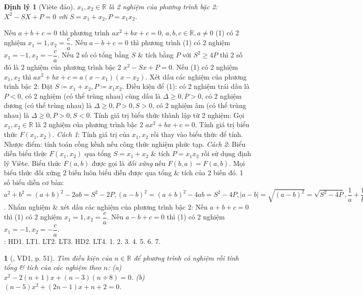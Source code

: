 \documentclass{article}
\newtheorem{baitoan}{}
\newtheorem{dinhly}{Định lý}
\begin{document}
\begin{dinhly}[Vi\`ete đảo]
	$x_1,x_2\in\mathbb{R}$ là 2 nghiệm của phương trình bậc 2: $X^2 - SX + P = 0$ với $S = x_1 + x_2,P = x_1x_2$.
\end{dinhly}
\noindent{} Nếu $a + b + c = 0$ thì phương trình $ax^2 + bx + c = 0$, $a,b,c\in\mathbb{R},a\ne0$ (1) có 2 nghiệm $x_1 = 1,x_2 = \dfrac{c}{a}$. Nếu $a - b + c = 0$ thì phương trình (1) có 2 nghiệm $x_1 = -1,x_2 = -\dfrac{c}{a}$.  Nếu 2 số có tổng bằng $S$ \& tích bằng $P$ với $S^2\ge4P$ thì 2 số đó là 2 nghiệm của phương trình bậc 2 $x^2 - Sx + P = 0$.  Nếu (1) có 2 nghiệm $x_1,x_2$ thì $ax^2 + bx + c = a(x - x_1)(x - x_2)$.  {\sf Xét dấu các nghiệm của phương trình bậc 2}: Đặt $S\coloneqq x_1 + x_2,P\coloneqq x_1x_2$. Điều kiện để (1): có 2 nghiệm trái dấu là $P < 0$, có 2 nghiệm (có thể trùng nhau) cùng dấu là $\Delta\ge0,P > 0$, có 2 nghiệm dương (có thể trùng nhau) là $\Delta\ge0,P > 0,S > 0$, có 2 nghiệm âm (có thể trùng nhau) là $\Delta\ge0,P > 0,S < 0$.  {\sf Tính giá trị biểu thức thành lập từ 2 nghiệm}: Gọi $x_1,x_2\in\mathbb{R}$ là 2 nghiệm của phương trình bậc 2 $ax^2 + bx + c = 0$. Tính giá trị biểu thức $F(x_1,x_2)$. \textit{Cách 1}: Tính giá trị của $x_1,x_2$ rồi thay vào biểu thức để tính. Nhược điểm: tính toán cồng kềnh nếu công thức nghiệm phức tạp. \textit{Cách 2}: Biểu diễn biểu thức $F(x_1,x_2)$ qua tổng $S = x_1 + x_2$ \& tích $P = x_1x_2$ rồi sử dụng định lý Vi\`ete.  Biểu thức $F(a,b)$ được gọi là \textit{đối xứng} nếu $F(b,a) = F(a,b)$. Mọi biểu thức đối xứng 2 biến luôn biểu diễn được qua tổng \& tích của 2 biến đó. 1 số biểu diễn cơ bản: $a^2 + b^2 = (a + b)^2 - 2ab = S^2 - 2P,(a - b)^2 = (a + b)^2 - 4ab = S^2 - 4P,|a - b| = \sqrt{(a - b)^2} = \sqrt{S^2 - 4P},\dfrac{1}{a} + \dfrac{1}{b} = \dfrac{a + b}{ab} = \dfrac{S}{P},a^3 + b^3 = (a + b)^3 - 3ab(a + b) = S^3 - 3PS,a^4 + b^4 = (a^2 + b^2)^2 - 2a^2b^2 = (S^2 - 2P)^2 - 2P^2$.  {\sf Nhẩm nghiệm \& xét dấu các nghiệm của phương trình bậc 2}: Nếu $a + b + c = 0$ thì (1) có 2 nghiệm $x_1 = 1,x_2 = \dfrac{c}{a}$. Nếu $a - b + c = 0$ thì (1) có 2 nghiệm $x_1 = -1,x_2 = -\dfrac{c}{a}$.\\

\noindent\cite[Chap. VII, \S3, pp. 61--65]{SGK_Toan_9_Canh_Dieu_tap_2}: HD1. LT1. LT2. LT3. HD2. LT4. 1. 2. 3. 4. 5. 6. 7.

\begin{baitoan}[\cite{Binh_boi_duong_Toan_9_tap_2}, VD1, p. 51]
	Tìm điều kiện của $n\in\mathbb{R}$ để phương trình có nghiệm rồi tính tổng \& tích của các nghiệm theo $n$: (a) $x^2 - 2(n + 1)x + (n - 3)(n + 8) = 0$. (b) $(n - 5)x^2 + (2n - 1)x + n + 2 = 0$.
\end{baitoan}
\end{document}
